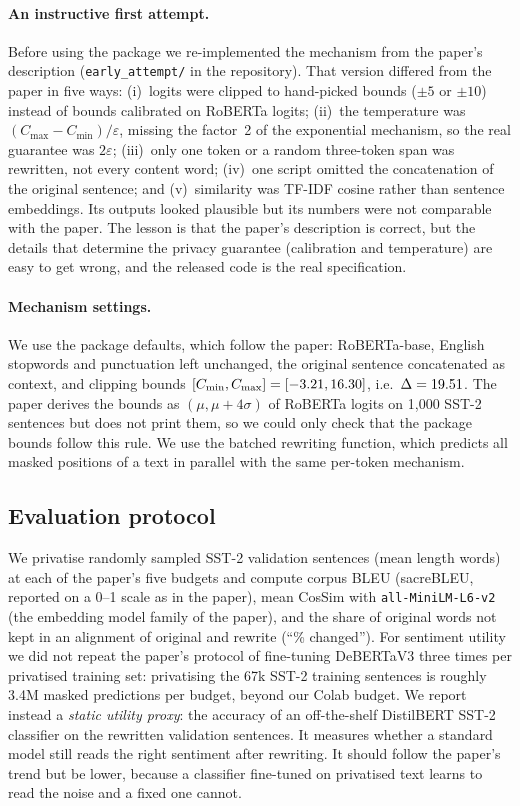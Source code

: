 \documentclass[11pt]{article}
\begin{document}
\paragraph{An instructive first attempt.} Before using the package we re-implemented the mechanism from the paper's description (\texttt{early\_attempt/} in the repository). That version differed from the paper in five ways: (i)~logits were clipped to hand-picked bounds ($\pm5$ or $\pm10$) instead of bounds calibrated on RoBERTa logits; (ii)~the temperature was $(C_{\max}-C_{\min})/\varepsilon$, missing the factor~2 of the exponential mechanism, so the real guarantee was $2\varepsilon$; (iii)~only one token or a random three-token span was rewritten, not every content word; (iv)~one script omitted the concatenation of the original sentence; and (v)~similarity was TF-IDF cosine rather than sentence embeddings. Its outputs looked plausible but its numbers were not comparable with the paper. The lesson is that the paper's description is correct, but the details that determine the privacy guarantee (calibration and temperature) are easy to get wrong, and the released code is the real specification.

\paragraph{Mechanism settings.} We use the package defaults, which follow the paper: RoBERTa-base, English stopwords and punctuation left unchanged, the original sentence concatenated as context, and clipping bounds $[C_{\min}, C_{\max}] = [-3.21, 16.30]$, i.e.\ $\Delta = 19.51$. The paper derives the bounds as $(\mu, \mu+4\sigma)$ of RoBERTa logits on 1{,}000 SST-2 sentences but does not print them, so we could only check that the package bounds follow this rule. We use the batched rewriting function, which predicts all masked positions of a text in parallel with the same per-token mechanism.

\subsection{Evaluation protocol}
We privatise \NSST{} randomly sampled SST-2 validation sentences \citep{socher-etal-2013-recursive} (mean length \SSTLen{} words) at each of the paper's five budgets and compute corpus BLEU (sacreBLEU, reported on a 0--1 scale as in the paper), mean CosSim with \texttt{all-MiniLM-L6-v2} (the embedding model family of the paper), and the share of original words not kept in an alignment of original and rewrite (``\% changed''). For sentiment utility we did not repeat the paper's protocol of fine-tuning DeBERTaV3 three times per privatised training set: privatising the 67k SST-2 training sentences is roughly 3.4M masked predictions per budget, beyond our Colab budget. We report instead a \emph{static utility proxy}: the accuracy of an off-the-shelf DistilBERT SST-2 classifier on the rewritten validation sentences. It measures whether a standard model still reads the right sentiment after rewriting. It should follow the paper's trend but be lower, because a classifier fine-tuned on privatised text learns to read the noise and a fixed one cannot.
\end{document}
